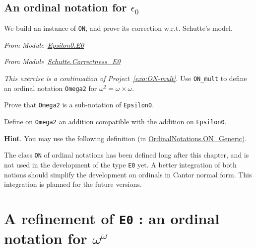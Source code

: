 \subsection{An ordinal notation for  \texorpdfstring{$\epsilon_0$}{epsilon0}}

We build an instance of \texttt{ON}, and prove its correction w.r.t. Schutte's model.

\emph{From Module~\href{../theories/html/hydras.Epsilon0.E0.html}{Epsilon0.E0}}



\label{instance-epsilon0}

\emph{From Module~\href{../theories/html/hydras.Schutte.Correctness_E0.html}{Schutte.Correctness\_E0}}






\begin{project}
 \emph{This exercise is a continuation of Project~\vref{exo:ON-mult}.}
Use \texttt{ON\_mult} to define an ordinal notation \texttt{Omega2} for $\omega^2=\omega\times\omega$.

Prove that \texttt{Omega2} is a sub-notation of \texttt{Epsilon0}.

Define on \texttt{Omega2} an addition compatible with the addition on \texttt{Epsilon0}.

\textbf{Hint}. You may use the following definition (in 
    \href{../theories/html/hydras.OrdinalNotations.ON_Generic.html}{OrdinalNotations.ON\_Generic}).


    
     \end{project}

    \begin{project}
    The class \texttt{ON} of ordinal notations has been defined long after this 
    chapter, and is not used in the development of the type \texttt{E0} yet.
    A better integration of both notions should simplify the development on ordinals in Cantor normal form. This integration is planned for the future versions.

    \end{project}

 

    \section{A refinement of \texttt{E0} : an ordinal notation for \texorpdfstring{$\omega^\omega$}{omega\^omega}}

